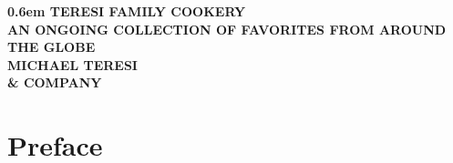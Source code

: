 \newcommand{\recipeend}[0]{
	{\centering \pgfornament[scale=0.45]{88}\par}
}

\newcommand\ragmarpar[1]{%
	\stepcounter{pl}\label{pl-\thepl}%
	\ifthenelse{\isodd{\pageref{pl-\thepl}}}%
	{\marginpar{\RaggedRight #1}}
	{\marginpar{\RaggedLeft #1}}
}

\frenchspacing
\let\cleardoublepage=\clearpage

\pagestyle{fancy}
\newcommand{\changefont}{%
	\fontsize{9}{11}\selectfont
}
\fancyhf{}
\fancyhead[LE,RO]{\changefont \slshape \rightmark} %
\fancyhead[RE,LO]{\changefont \slshape \leftmark} %
\fancyfoot[C]{\changefont \thepage} %




\frontmatter
\begin{titlepage}
\onecolumn
\pagestyle{empty}
\newcommand\nbvspace[1][3]{\vspace*{\stretch{#1}}}
\newcommand\nbstretchyspace{\spaceskip0.5em plus 0.25em minus 0.25em}
\newcommand{\nbtitlestretch}{\spaceskip0.6em}
{
	\centering
	\bfseries
	\nbvspace[1]
	\Huge
	{\nbtitlestretch
		TERESI FAMILY COOKERY
	}\\
	\nbvspace[1]
	\footnotesize
	AN ONGOING COLLECTION OF FAVORITES FROM AROUND THE GLOBE\\
	\nbvspace[1]
	\Large MICHAEL TERESI \\ \small \& COMPANY\\
	\nbvspace[1]
	\hspace{1em}  %
	\vfill
}
\end{titlepage}

\tableofcontents
\chapter*{Preface}


\nopagebreak

